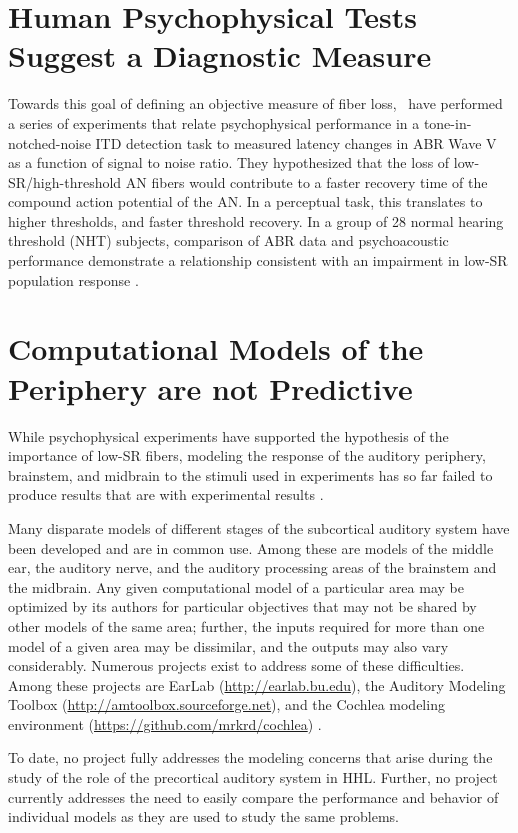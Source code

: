 \section{Human Psychophysical Tests Suggest a Diagnostic Measure}
Towards this goal of defining an objective measure of fiber loss,~\cite{Mehraei2015Individual,Mehraei2016Auditory} have performed a series of experiments that relate psychophysical performance in a tone-in-notched-noise ITD detection task to measured latency changes in ABR Wave V as a function of signal to noise ratio.  They hypothesized that the loss of low-SR/high-threshold AN fibers would contribute to a faster recovery time of the compound action potential of the AN.  In a perceptual task, this translates to higher thresholds, and faster threshold recovery. In a group of 28 normal hearing threshold (NHT) subjects, comparison of ABR data and psychoacoustic performance demonstrate a relationship consistent with an impairment in low-SR population response \citep{Mehraei2016Auditory}.

\section{Computational Models of the Periphery are not Predictive}

While psychophysical experiments have supported the hypothesis of the importance of low-SR fibers, modeling the response of the auditory periphery, brainstem, and midbrain to the stimuli used in experiments has so far failed to produce results that are with experimental results \citep{Mehraei2016Auditory}.

Many disparate models of different stages of the subcortical auditory system have been developed and are in common use.  Among these are models of the middle ear, the auditory nerve, and the auditory processing areas of the brainstem and the midbrain.  Any given computational model of a particular area may be optimized by its authors for particular objectives that may not be shared by other models of the same area; further, the inputs required for more than one model of a given area may be dissimilar, and the outputs may also vary considerably.    Numerous projects exist to address some of these difficulties.  Among these projects are EarLab (\url{http://earlab.bu.edu}), the Auditory Modeling Toolbox (\url{http://amtoolbox.sourceforge.net}), and the Cochlea modeling environment (\url{https://github.com/mrkrd/cochlea}) \citep{Rudnicki2014Cochlea}.   

To date, no project fully addresses the modeling concerns that arise during the study of the role of the precortical auditory system in HHL.   Further, no project currently addresses the need to easily compare the performance and behavior of individual models as they are used to study the same problems.

